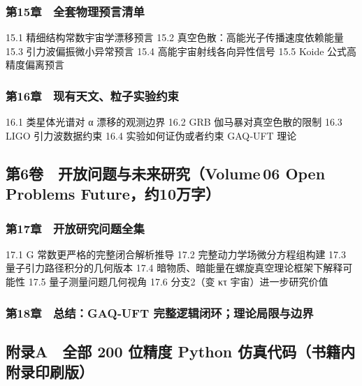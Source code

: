 \subsubsection{第15章 全套物理预言清单}\label{ux7b2c15ux7ae0-ux5168ux5957ux7269ux7406ux9884ux8a00ux6e05ux5355}

15.1 精细结构常数宇宙学漂移预言 15.2 真空色散：高能光子传播速度依赖能量
15.3 引力波偏振微小异常预言 15.4 高能宇宙射线各向异性信号 15.5 Koide
公式高精度偏离预言

\subsubsection{第16章 现有天文、粒子实验约束}\label{ux7b2c16ux7ae0-ux73b0ux6709ux5929ux6587ux7c92ux5b50ux5b9eux9a8cux7ea6ux675f}

16.1 类星体光谱对 α 漂移的观测边界 16.2 GRB 伽马暴对真空色散的限制 16.3
LIGO 引力波数据约束 16.4 实验如何证伪或者约束 GAQ‑UFT 理论

\subsection{第6卷 开放问题与未来研究（Volume\,06 Open Problems
Future，约10万字）}\label{ux7b2c6ux5377-ux5f00ux653eux95eeux9898ux4e0eux672aux6765ux7814ux7a76volume-06-open-problems-futureux7ea610ux4e07ux5b57}

\subsubsection{第17章 开放研究问题全集}\label{ux7b2c17ux7ae0-ux5f00ux653eux7814ux7a76ux95eeux9898ux5168ux96c6}

17.1 G 常数更严格的完整闭合解析推导 17.2 完整动力学场微分方程组构建 17.3
量子引力路径积分的几何版本 17.4
暗物质、暗能量在螺旋真空理论框架下解释可能性 17.5 量子测量问题几何视角
17.6 分支2（变 κτ 宇宙）进一步研究价值

\subsubsection{第18章 总结：GAQ‑UFT
完整逻辑闭环；理论局限与边界}\label{ux7b2c18ux7ae0-ux603bux7ed3gaquft-ux5b8cux6574ux903bux8f91ux95edux73afux7406ux8bbaux5c40ux9650ux4e0eux8fb9ux754c}

\subsection{附录A 全部 200 位精度 Python
仿真代码（书籍内附录印刷版）}\label{ux9644ux5f55a-ux5168ux90e8-200-ux4f4dux7cbeux5ea6-python-ux4effux771fux4ee3ux7801ux4e66ux7c4dux5185ux9644ux5f55ux5370ux5237ux7248}

